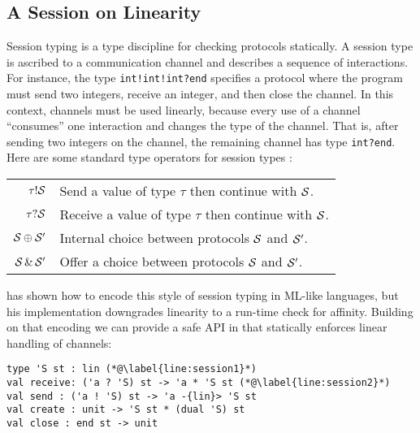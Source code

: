 \subsection{A Session on Linearity}
\label{sec:session-linearity}

Session typing \cite{Honda1993,DBLP:conf/esop/HondaVK98} is a type
discipline for checking protocols statically. A session type is
ascribed to a communication channel and describes
a sequence of interactions. For instance, the type
\lstinline{int!int!int?end} specifies a protocol
where the program must send two integers, receive an integer, and then
close the channel.
%
In this context, channels must be used linearly, because every use of
a channel ``consumes'' one interaction and  changes the type of the
channel. That is, after sending two integers on the channel,
the remaining channel has type \lstinline{int?end}.
%
Here are some standard type operators for session types \SType:
\begin{center}
  \begin{tabular}[t]{rl}
    $\tau ! \mathcal S$ & Send a value of type $\tau$ then continue with $\mathcal S$.\\
    $\tau ? \mathcal S$& Receive a value of type $\tau$ then continue with $\mathcal S$.\\
    $\mathcal S \oplus \mathcal S'$& Internal choice between protocols $\mathcal S$ and $\mathcal S'$.\\
    $\mathcal S \operatorname{\&} \mathcal S'$
                    & Offer a choice between protocols $\mathcal S$ and $\mathcal S'$.
  \end{tabular}
\end{center}

\citet{DBLP:journals/jfp/Padovani17}  has shown how to encode this
style of session typing in ML-like languages, but his implementation
downgrades linearity to a run-time check for affinity. Building on that
encoding we can provide a safe API in \lang that statically enforces
linear handling of channels:
%
\begin{lstlisting}
type 'S st : lin (*@\label{line:session1}*)
val receive: ('a ? 'S) st -> 'a * 'S st (*@\label{line:session2}*)
val send : ('a ! 'S) st -> 'a -{lin}> 'S st
val create : unit -> 'S st * (dual 'S) st
val close : end st -> unit
\end{lstlisting}

